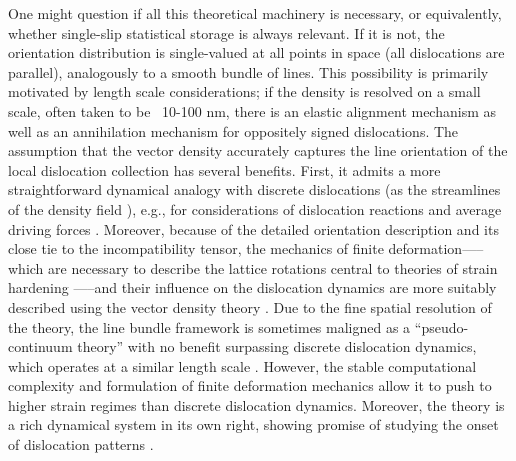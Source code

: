 One might question if all this theoretical machinery is necessary, or equivalently, whether single-slip statistical storage is always relevant. If it is not, the orientation distribution is single-valued at all points in space (all dislocations are parallel), analogously to a smooth bundle of lines. This possibility is primarily motivated by length scale considerations; if the density is resolved on a small scale,  often taken to be ~10-100 nm, there is an elastic alignment mechanism as well as an annihilation mechanism for oppositely signed dislocations. The assumption that the vector density accurately captures the line orientation of the local dislocation collection has several benefits. First, it admits a more straightforward dynamical analogy with discrete dislocations (as the streamlines of the density field \cite{Lin2021a}), e.g., for considerations of dislocation reactions \cite{Weger2019,Lin2020,Vivekanandan2021,vivekanandanDataDrivenApproach2023} and average driving forces \cite{Anderson2021,andersonDislocationCorrelationsContinuum2024}. Moreover, because of the detailed orientation description and its close tie to the incompatibility tensor, the mechanics of finite deformation—--which are necessary to describe the lattice rotations central to theories of strain hardening \cite{kocksPhysicsPhenomenologyStrain2003,sauzayScalingLawsDislocation2011}—--and their influence on the dislocation dynamics are more suitably described using the vector density theory \cite{Starkey2020,Hochrainer2020}. Due to the fine spatial resolution of the theory, the line bundle framework is sometimes maligned as a ``pseudo-continuum theory'' with no benefit surpassing discrete dislocation dynamics, which operates at a similar length scale \cite{Monavari2018,Hochrainer2022,Groma2021}. However, the stable computational complexity \cite{Lin2021} and formulation of finite deformation mechanics \cite{Starkey2020,starkeyTotalLagrangeImplementation2022} allow it to push to higher strain regimes than discrete dislocation dynamics. Moreover, the theory is a rich dynamical system in its own right, showing promise of studying the onset of dislocation patterns \cite{Xia2015}. 

